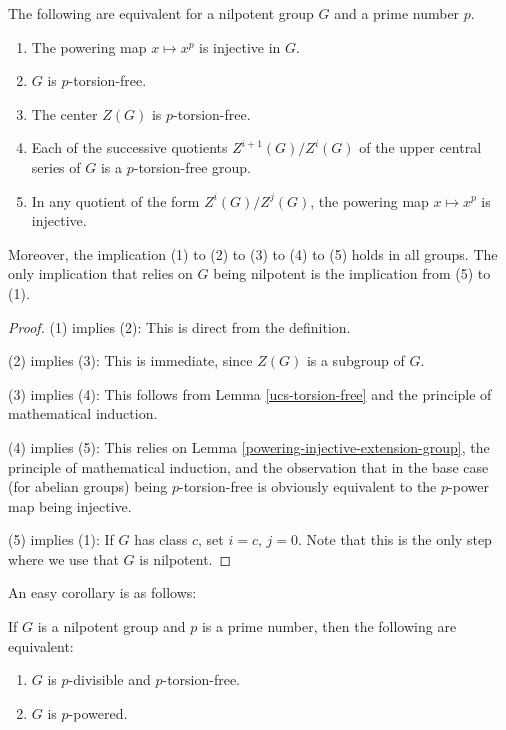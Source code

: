 \documentclass{ucetd}
\begin{document}
\begin{theorem}\label{thm:torsion-free-equivalence-theorem}
  The following are equivalent for a nilpotent group $G$ and a prime
  number $p$.

  \begin{enumerate}
  \item The powering map $x \mapsto x^p$ is injective in $G$.
  \item $G$ is $p$-torsion-free.
  \item The center $Z(G)$ is $p$-torsion-free.
  \item Each of the successive quotients $Z^{i+1}(G)/Z^i(G)$ of the
    upper central series of $G$ is a $p$-torsion-free group.
  \item In any quotient of the form $Z^i(G)/Z^j(G)$, the powering map
    $x \mapsto x^p$ is injective.

  \end{enumerate}

  Moreover, the implication (1) to (2) to (3) to (4) to (5) holds in
  all groups. The only implication that relies on $G$ being nilpotent
  is the implication from (5) to (1).
\end{theorem}

\begin{proof}
  (1) implies (2): This is direct from the definition.

  (2) implies (3): This is immediate, since $Z(G)$ is a subgroup of $G$.

  (3) implies (4): This follows from Lemma \ref{ucs-torsion-free} and the
  principle of mathematical induction.

  (4) implies (5): This relies on Lemma
  \ref{powering-injective-extension-group}, the principle of
  mathematical induction, and the observation that in the base case
  (for abelian groups) being $p$-torsion-free is obviously equivalent
  to the $p$-power map being injective.

  (5) implies (1): If $G$ has class $c$, set $i = c$, $j =
  0$. Note that this is the only step where we use that $G$ is
  nilpotent.
\end{proof}

An easy corollary is as follows:

\begin{lemma}\label{nilpotent-powered-iff-d-t-f}
  If $G$ is a nilpotent group and $p$ is a prime number, then the following are equivalent:

  \begin{enumerate}
  \item $G$ is $p$-divisible and $p$-torsion-free.
  \item $G$ is $p$-powered.
  \end{enumerate}
\end{lemma}
\end{document}
